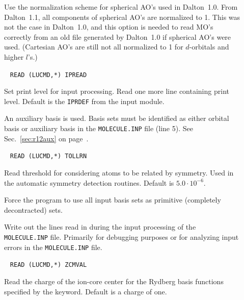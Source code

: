 \begin{description}

\item[] Use the normalization scheme for spherical AO's used in Dalton~1.0.
From Dalton~1.1, all components of spherical AO's are normalized to 1.
This was not the case in Dalton~1.0, and this option is needed to read
MO's correctly from an old file generated by Dalton~1.0 if spherical AO's were used.
(Cartesian AO's are still not all normalized to 1 for $d$-orbitals and higher $l$'s.)

\item[]\verb| |\newline
\verb|READ (LUCMD,*) IPREAD|

Set print level for input processing.  Read one more line containing
print level. Default is the \verb|IPRDEF| from the  input
module.

\item[] An auxiliary basis is used.
Basis sets must be identified as either orbital basis or
auxiliary basis in the \verb|MOLECULE.INP| file (line 5).
See Sec.~\ref{sec:r12aux} on page~\pageref{sec:r12aux}.

\item[]\verb| |\newline
\verb|READ (LUCMD,*) TOLLRN|

Read threshold for considering atoms to be related by symmetry. Used
in the automatic symmetry detection routines. Default is $5.0\cdot
10^{-6}$.

\item[] Force the program to use all input basis sets as primitive (completely decontracted) sets.

\item[] Write out the lines read in during the input
  processing of the \verb|MOLECULE.INP| file. Primarily for debugging
  purposes or for analyzing input errors in the \verb|MOLECULE.INP|
  file.

\item[]\verb| |\newline
\verb|READ (LUCMD,*) ZCMVAL|

Read the charge of the ion-core center for the Rydberg basis functions specified
by the  keyword. Default is a charge of one.

\end{description}

